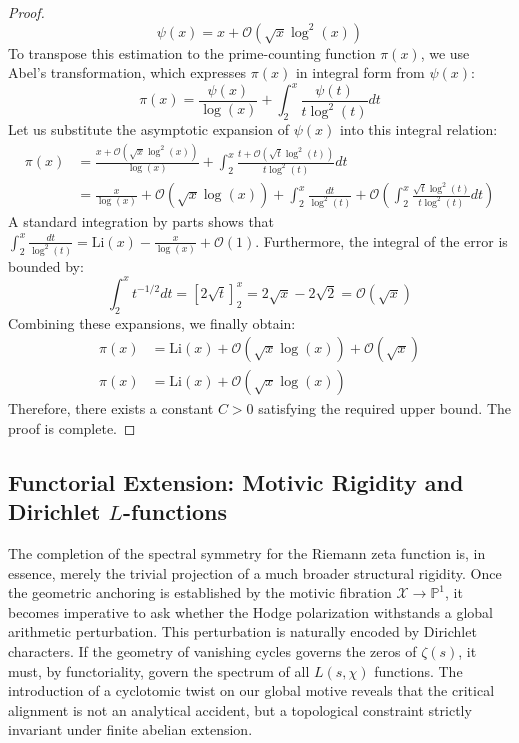 \documentclass[
]{article}
\begin{document}
\begin{proof}
\begin{equation*}
\psi(x) = x + \mathcal{O}(\sqrt{x} \log^2(x))
\end{equation*}
To transpose this estimation to the prime-counting function $\pi(x)$, we use Abel's transformation, which expresses $\pi(x)$ in integral form from $\psi(x)$:
\begin{equation*}
\pi(x) = \frac{\psi(x)}{\log(x)} + \int_2^x \frac{\psi(t)}{t \log^2(t)} dt
\end{equation*}
Let us substitute the asymptotic expansion of $\psi(x)$ into this integral relation:
\begin{align*}
\pi(x) &= \frac{x + \mathcal{O}(\sqrt{x} \log^2(x))}{\log(x)} + \int_2^x \frac{t + \mathcal{O}(\sqrt{t} \log^2(t))}{t \log^2(t)} dt \\
&= \frac{x}{\log(x)} + \mathcal{O}(\sqrt{x} \log(x)) + \int_2^x \frac{dt}{\log^2(t)} + \mathcal{O}\left( \int_2^x \frac{\sqrt{t} \log^2(t)}{t \log^2(t)} dt \right)
\end{align*}
A standard integration by parts shows that $\int_2^x \frac{dt}{\log^2(t)} = \mathrm{Li}(x) - \frac{x}{\log(x)} + \mathcal{O}(1)$.
Furthermore, the integral of the error is bounded by:
\begin{equation*}
\int_2^x t^{-1/2} dt = \left[ 2\sqrt{t} \right]_2^x = 2\sqrt{x} - 2\sqrt{2} = \mathcal{O}(\sqrt{x})
\end{equation*}
Combining these expansions, we finally obtain:
\begin{align*}
\pi(x) &= \mathrm{Li}(x) + \mathcal{O}(\sqrt{x} \log(x)) + \mathcal{O}(\sqrt{x}) \\
\pi(x) &= \mathrm{Li}(x) + \mathcal{O}(\sqrt{x} \log(x))
\end{align*}
Therefore, there exists a constant $C > 0$ satisfying the required upper bound. The proof is complete.
\end{proof}

\subsection{Functorial Extension: Motivic Rigidity and Dirichlet $L$-functions}

The completion of the spectral symmetry for the Riemann zeta function is, in essence, merely the trivial projection of a much broader structural rigidity. Once the geometric anchoring is established by the motivic fibration $\mathcal{X} \to \mathbb{P}^1$, it becomes imperative to ask whether the Hodge polarization withstands a global arithmetic perturbation. This perturbation is naturally encoded by Dirichlet characters. If the geometry of vanishing cycles governs the zeros of $\zeta(s)$, it must, by functoriality, govern the spectrum of all $L(s, \chi)$ functions. The introduction of a cyclotomic twist on our global motive reveals that the critical alignment is not an analytical accident, but a topological constraint strictly invariant under finite abelian extension.
\end{document}
